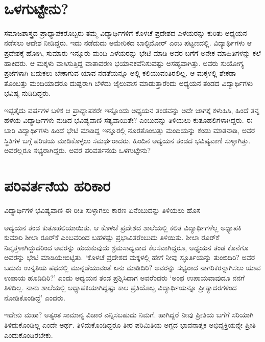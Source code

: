 ~\\[-2\baselineskip]


\section*{ಒಳಗುಟ್ಟೇನು?}

\vskip -2pt

ಸಮಾಜಶಾಸ್ತ್ರದ ಪ್ರಾಧ್ಯಾಪಕರೊಬ್ಬರು ತಮ್ಮ ವಿದ್ಯಾರ್ಥಿಗಳಿಗೆ ಕೊಳಚೆ ಪ್ರದೇಶದ ಎಳೆಯರನ್ನು ಕುರಿತು ಅಧ್ಯಯನ ನಡೆಸಲು ಆದೇಶ ನೀಡಿದ್ದರು. ಇದು ನಡೆದುದು ಅಮೇರಿಕದ ಬಾಲ್ಟಿಮೋರ್ ಎಂಬ ಪಟ್ಟಣದಲ್ಲಿ. ವಿದ್ಯಾರ್ಥಿಗಳು ಆ ಪ್ರದೇಶಕ್ಕೆ ಹೋಗಿ, ಸುಮಾರು ಇನ್ನೂರು ಮಂದಿ ಎಳೆಯರನ್ನು ಭೇಟಿ ಮಾಡಿ ಅವರ ಬಗೆಗೆ ಅನೇಕ ಮಾಹಿತಿಗಳನ್ನು ಕಲೆ ಹಾಕಿದರು. ಆ ಮಕ್ಕಳು ವಾಸಿಸುತ್ತಿದ್ದ ವಾತಾವರಣ ಭಯಾನಕವೆನಿಸುವಷ್ಟು ಅಸಹ್ಯವಾಗಿತ್ತು. ಅವರು ಸುಯೋಗ್ಯ ಪ್ರಜೆಗಳಾಗಿ ಬದುಕಲು ಬೇಕಾಗುವ ಯಾವ ನಡತೆಯನ್ನೂ ಅಲ್ಲಿ ಕಲಿಯುವಂತಿರಲಿಲ್ಲ. ಆ ಮಕ್ಕಳಲ್ಲಿ ಶೇಕಡಾ ತೊಂಬತ್ತು ಮಂದಿಯಾದರೂ ದುಷ್ಟರಾಗಿ ಬೆಳೆದು ಜೈಲುವಾಸ ಮಾಡುತ್ತಾರೆಂದು ಅಧ್ಯಯನ ತಂಡದ ವಿದ್ಯಾರ್ಥಿಗಳು ಭವಿಷ್ಯ ನುಡಿದಿದ್ದರು.

ಇಪ್ಪತ್ತೈದು ವರ್ಷಗಳ ಬಳಿಕ ಆ ಪ್ರಾಧ್ಯಾಪಕರೇ ಇನ್ನೊಂದು ಅಧ್ಯಯನ ತಂಡವನ್ನು ಅದೇ ಜಾಗಕ್ಕೆ ಕಳುಹಿಸಿ, ಹಿಂದೆ ತನ್ನ ಹಳೆಯ ವಿದ್ಯಾರ್ಥಿಗಳು ನುಡಿದ ಭವಿಷ್ಯವಾಣಿ ಸತ್ಯವಾಯಿತೇ? ಎಂಬುದನ್ನು ತಿಳಿಯಲು ಕುತೂಹಲಿಗಳಾಗಿದ್ದರು. ಈ ಬಾರಿ ವಿದ್ಯಾರ್ಥಿಗಳು ಹಿಂದೆ ಭೇಟಿ ಮಾಡಿದ್ದ ಇನ್ನೂರಲ್ಲಿ ನೂರತೊಂಬತ್ತು ಮಂದಿಯನ್ನು ಕಂಡು ಮಾತನಾಡಿ, ಅವರ ಸ್ಥಿತಿಗಳ ಬಗ್ಗೆ ಪರಿಚಯ ಮಾಡಿಕೊಳ್ಳಲು ಸಮರ್ಥರಾದರು. ಹಿಂದಿನ ಅಧ್ಯಯನ ತಂಡದ ಭವಿಷ್ಯವಾಣಿ ಸುಳ್ಳಾಗಿತ್ತು. ಅವರೆಲ್ಲರೂ ಸಭ್ಯರಾಗಿದ್ದರು. ಅವರ ಪರಿವರ್ತನೆಯ ಒಳಗುಟ್ಟೇನು?


\section*{ಪರಿವರ್ತನೆಯ ಹರಿಕಾರ}

\vskip -2pt

{\parfillskip=0pt ವಿದ್ಯಾರ್ಥಿಗಳ ಭವಿಷ್ಯವಾಣಿ ಈ ರೀತಿ ಸುಳ್ಳಾಗಲು ಕಾರಣ ಏನೆಂಬುದನ್ನು ತಿಳಿಯಲು ಹೊಸ\par}\newpage\noindent ಅಧ್ಯಯನ ತಂಡ ಕುತೂಹಲಿಯಾಯಿತು. ಆ ಕೊಳಚೆ ಪ್ರದೇಶದ ಶಾಲೆಯಲ್ಲಿ ಕಲಿತ ವಿದ್ಯಾರ್ಥಿಗಳೆಲ್ಲ ಅಧ್ಯಾಪಕಿ ಕುಮಾರಿ ಶೀಲಾ ರೂರ್​ಕೆ ಎಂಬವರಿಂದ ಬಹಳಷ್ಟು ಪ್ರಭಾವಿತರೆಂಬುದು ತಿಳಿಯಿತು. ಶೀಲಾ ರೂರ್​ಕೆ ನಿವೃತ್ತಳಾಗಿದ್ದುದರಿಂದ ಅವರನ್ನು ಹುಡುಕುವುದು ಶ್ರಮಸಾಧ್ಯವಾದ ಕೆಲಸವಾಗಿದ್ದರೂ, ಅಧ್ಯಯನ ತಂಡ ಕೊನೆಗೂ ಅವರನ್ನು ಭೇಟಿ ಮಾಡಿಯೇಬಿಟ್ಟಿತು. ‘ಕೊಳಚೆ ಪ್ರದೇಶದ ಮಕ್ಕಳಲ್ಲಿ ಹೇಗೆ ನೀವು ಸ್ಫೂರ್ತಿಯನ್ನು ತುಂಬಿದಿರಿ? ಅವರ ಬದುಕು ಉನ್ನತಿಯ ಪಥದಲ್ಲಿ ಮುನ್ನಡೆಯುವಂತೆ ಏನು ಮಾಡಿದಿರಿ? ಅವರನ್ನು ಸಭ್ಯರಾದ ನಾಗರಿಕರನ್ನಾಗಿಸಲು ಯಾವ ಉಪಾಯ ಹೂಡಿದಿರಿ?’ ಎಂದು ಅಧ್ಯಯನ ತಂಡ ಪ್ರಶ್ನಿಸಿದಾಗ ಅವರೆಂದರು ‘ಅಂಥ ಉಪಾಯವಾವುದೂ ನನಗೆ ತಿಳಿದಿಲ್ಲ. ನಾನು ಶಾಲೆಯಲ್ಲಿ ಅಧ್ಯಾಪಕಿಯಾಗಿದ್ದಷ್ಟು ಕಾಲ ಪ್ರತಿಯೊಬ್ಬ ವಿದ್ಯಾರ್ಥಿಯನ್ನೂ ಪ್ರೀತ್ಯಾದರಗಳಿಂದ ನೋಡಿಕೊಂಡಿದ್ದೆ’ ಎಂದರು.

ಇದೇನು ಮಹಾ? ಅತ್ಯಂತ ಸಾಮಾನ್ಯ ವಿಚಾರ ಎನ್ನಿಸಬಹುದು ನಿಮಗೆ. ಹಾಗಿದ್ದರೆ ನೀವು ಪ್ರೀತಿಯ ಬಗೆಗೆ ಸರಿಯಾಗಿ ತಿಳಿದುಕೊಂಡಿಲ್ಲ ಎಂದೇ ಅರ್ಥ. ತಿಳಿದುಕೊಂಡಿದ್ದರೂ ತೀರ ಪರಿಮಿತಿಯ ಅಗ್ಗದ ಭಾವನಾತ್ಮಕ ಅಭಿವ್ಯಕ್ತಿಯನ್ನೇ ಪ್ರೀತಿ ಎಂದುಕೊಂಡಿರಬೇಕು.

